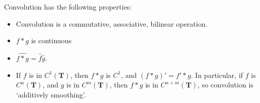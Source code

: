\begin{theorem}
    Convolution has the following properties:
    \begin{itemize}
        \item Convolution is a commutative, associative, bilinear operation.
        \item $f * g$ is continuous
        \item $\widehat{f * g} = \widehat{f} \widehat{g}$.
        \item If $f$ is in $C^1(\mathbf{T})$, then $f * g$ is $C^1$, and $(f * g)' = f' * g$. In particular, if $f$ is $C^n(\mathbf{T})$, and $g$ is in $C^m(\mathbf{T})$, then $f * g$ is in $C^{n+m}(\mathbf{T})$, so convolution is `additively smoothing'.
    \end{itemize}
\end{theorem}
